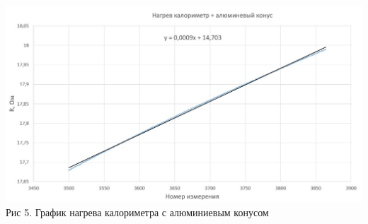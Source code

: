 \documentclass[a4paper, 12pt]{article}
\begin{document}
\begin{center}
		\includegraphics[width=15cm]{"Нагрев_алюм.jpg"}\\
		Рис 5. График нагрева калориметра с алюминиевым конусом
		

\end{center}
\end{document}
